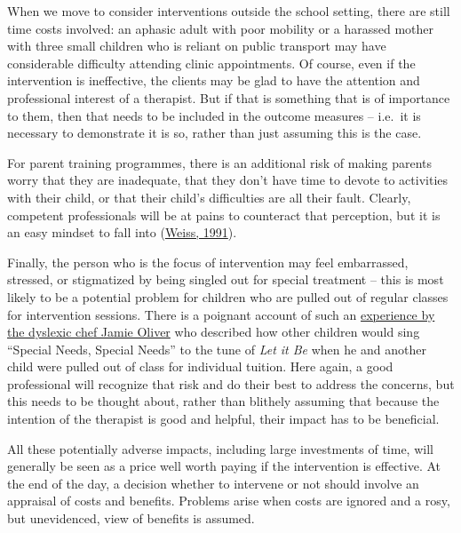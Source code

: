 \documentclass{krantz}
\begin{document}

When we move to consider interventions outside the school setting, there are still time costs involved: an aphasic adult with poor mobility or a harassed mother with three small children who is reliant on public transport may have considerable difficulty attending clinic appointments. Of course, even if the intervention is ineffective, the clients may be glad to have the attention and professional interest of a therapist. But if that is something that is of importance to them, then that needs to be included in the outcome measures -- i.e.~it is necessary to demonstrate it is so, rather than just assuming this is the case.

For parent training programmes, there is an additional risk of making parents worry that they are inadequate, that they don't have time to devote to activities with their child, or that their child's difficulties are all their fault. Clearly, competent professionals will be at pains to counteract that perception, but it is an easy mindset to fall into (\protect\hyperlink{ref-weiss1991}{Weiss, 1991}).

Finally, the person who is the focus of intervention may feel embarrassed, stressed, or stigmatized by being singled out for special treatment -- this is most likely to be a potential problem for children who are pulled out of regular classes for intervention sessions. There is a poignant account of such an \href{https://www.standard.co.uk/news/celebritynews/school-labelled-me-as-special-needs-says-chef-jamie-oliver-who-suffers-from-dyslexia-9033901.html}{experience by the dyslexic chef Jamie Oliver} who described how other children would sing ``Special Needs, Special Needs'' to the tune of \emph{Let it Be} when he and another child were pulled out of class for individual tuition. Here again, a good professional will recognize that risk and do their best to address the concerns, but this needs to be thought about, rather than blithely assuming that because the intention of the therapist is good and helpful, their impact has to be beneficial.   

All these potentially adverse impacts, including large investments of time, will generally be seen as a price well worth paying if the intervention is effective. At the end of the day, a decision whether to intervene or not should involve an appraisal of costs and benefits. Problems arise when costs are ignored and a rosy, but unevidenced, view of benefits is assumed.
\end{document}
